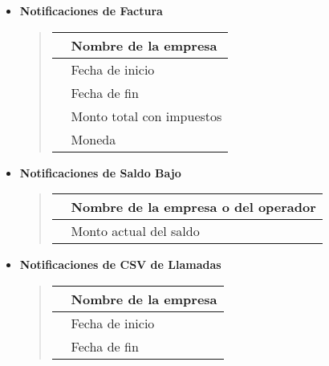 \documentclass[letterpaper,10pt,spanish]{sphinxmanual}
\begin{document}
\begin{itemize}
\begin{quote}
\end{quote}

\item {} 
\textbf{Notificaciones de Factura}
\begin{quote}

\noindent\begin{tabulary}{\linewidth}{|L|L|}
\hline

&
Nombre de la empresa
\\
\hline
{}
&
Fecha de inicio
\\
\hline
{}
&
Fecha de fin
\\
\hline
{}
&
Monto total con impuestos
\\
\hline
{}
&
Moneda
\\
\hline\end{tabulary}

\end{quote}

\item {} 
\textbf{Notificaciones de Saldo Bajo}
\begin{quote}

\noindent\begin{tabulary}{\linewidth}{|L|L|}
\hline

&
Nombre de la empresa o del operador
\\
\hline
{}
&
Monto actual del saldo
\\
\hline\end{tabulary}

\end{quote}

\item {} 
\textbf{Notificaciones de CSV de Llamadas}
\begin{quote}

\noindent\begin{tabulary}{\linewidth}{|L|L|}
\hline

&
Nombre de la empresa
\\
\hline
{}
&
Fecha de inicio
\\
\hline
{}
&
Fecha de fin
\\
\hline\end{tabulary}

\end{quote}


\end{itemize}
\end{document}
